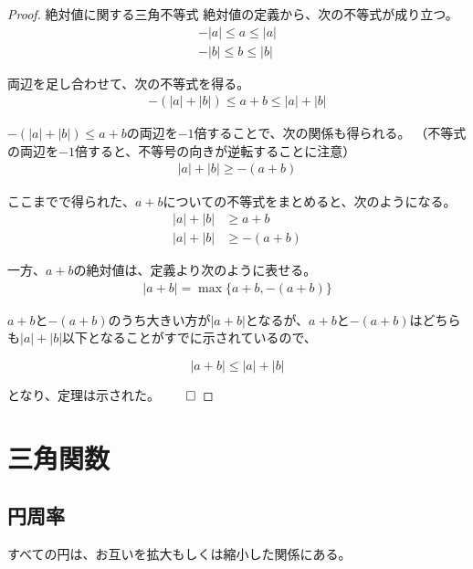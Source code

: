 \documentclass[../math-imaging]{subfiles}
\begin{document}
\begin{proof}{絶対値に関する三角不等式}
  絶対値の定義から、次の不等式が成り立つ。
  \begin{align}
    -|a| \leq a \leq |a| \\
    -|b| \leq b \leq |b|
  \end{align}

  両辺を足し合わせて、次の不等式を得る。
  \begin{align}
    -(|a| + |b|) \leq a + b \leq |a| + |b|
  \end{align}

  $-(|a| + |b|) \leq a + b$の両辺を$-1$倍することで、次の関係も得られる。
  （不等式の両辺を$-1$倍すると、不等号の向きが逆転することに注意）
  \begin{align}
    |a| + |b| \geq -(a + b)
  \end{align}

  ここまでで得られた、$a+b$についての不等式をまとめると、次のようになる。
  \begin{align}
    |a| + |b| & \geq a+b      \\
    |a| + |b| & \geq -(a + b)
  \end{align}

  一方、$a+b$の絶対値は、定義より次のように表せる。
  \begin{align}
    |a + b| = \max\{a + b, -(a + b)\}
  \end{align}

  $a+b$と$-(a+b)$のうち大きい方が$|a+b|$となるが、$a + b$と$-(a+b)$はどちらも$|a| + |b|$以下となることがすでに示されているので、

  \begin{equation}
    |a + b| \leq |a| + |b|
  \end{equation}

  となり、定理は示された。$\qed$
\end{proof}

\section{三角関数}

\subsection{円周率}

すべての円は、お互いを拡大もしくは縮小した関係にある。
\end{document}

